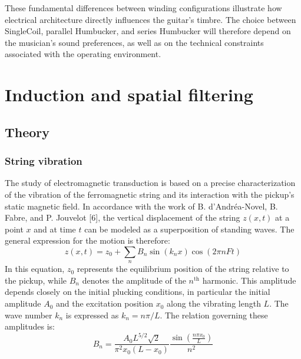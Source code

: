 \documentclass[11pt, a4paper]{article}
\begin{document}
These fundamental differences between winding configurations illustrate how electrical architecture directly influences the guitar's timbre. The choice between SingleCoil, parallel Humbucker, and series Humbucker will therefore depend on the musician's sound preferences, as well as on the technical constraints associated with the operating environment.

\newpage
\section{Induction and spatial filtering}

\subsection{Theory}
\subsubsection{String vibration}
The study of electromagnetic transduction is based on a precise characterization of the vibration of the ferromagnetic string and its interaction with the pickup's static magnetic field. In accordance with the work of B. d'Andréa-Novel, B. Fabre, and P. Jouvelot [6], the vertical displacement of the string $z(x,t)$ at a point $x$ and at time $t$ can be modeled as a superposition of standing waves. The general expression for the motion is therefore:
\begin{equation}
z(x,t) = z_0 + \sum_{n} B_n \sin(k_n x) \cos(2\pi n F t)
\end{equation}
In this equation, $z_0$ represents the equilibrium position of the string relative to the pickup, while $B_n$ denotes the amplitude of the $n^{\text{th}}$ harmonic. This amplitude depends closely on the initial plucking conditions, in particular the initial amplitude $A_0$ and the excitation position $x_0$ along the vibrating length $L$. The wave number $k_n$ is expressed as $k_n = n\pi/L$. The relation governing these amplitudes is:
\begin{equation}
B_n = \frac{A_0 L^{5/2} \sqrt{2}}{\pi^2 x_0 (L - x_0)} \frac{\sin\left(\frac{n\pi x_0}{L}\right)}{n^2}
\end{equation}
\end{document}
